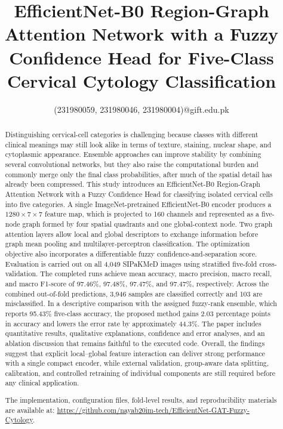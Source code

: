 \documentclass[10pt,conference]{IEEEtran}
\begin{document}
\title{EfficientNet-B0 Region-Graph Attention Network with a Fuzzy Confidence Head for Five-Class Cervical Cytology Classification}

\author{
{(231980059, 231980046, 231980004)}@gift.edu.pk
}

\maketitle

\begin{abstract}
Distinguishing cervical-cell categories is challenging because classes with different clinical meanings may still look alike in terms of texture, staining, nuclear shape, and cytoplasmic appearance. Ensemble approaches can improve stability by combining several convolutional networks, but they also raise the computational burden and commonly merge only the final class probabilities, after much of the spatial detail has already been compressed. This study introduces an EfficientNet-B0 Region-Graph Attention Network with a Fuzzy Confidence Head for classifying isolated cervical cells into five categories. A single ImageNet-pretrained EfficientNet-B0 encoder produces a $1280\times7\times7$ feature map, which is projected to 160 channels and represented as a five-node graph formed by four spatial quadrants and one global-context node. Two graph attention layers allow local and global descriptors to exchange information before graph mean pooling and multilayer-perceptron classification. The optimization objective also incorporates a differentiable fuzzy confidence-and-separation score. Evaluation is carried out on all 4,049 SIPaKMeD images using stratified five-fold cross-validation. The completed runs achieve mean accuracy, macro precision, macro recall, and macro F1-score of 97.46\%, 97.48\%, 97.47\%, and 97.47\%, respectively. Across the combined out-of-fold predictions, 3,946 samples are classified correctly and 103 are misclassified. In a descriptive comparison with the assigned fuzzy-rank ensemble, which reports 95.43\% five-class accuracy, the proposed method gains 2.03 percentage points in accuracy and lowers the error rate by approximately 44.3\%. The paper includes quantitative results, qualitative explanations, confidence and error analyses, and an ablation discussion that remains faithful to the executed code. Overall, the findings suggest that explicit local--global feature interaction can deliver strong performance with a single compact encoder, while external validation, group-aware data splitting, calibration, and controlled retraining of individual components are still required before any clinical application.

The implementation, configuration files, fold-level results, and
reproducibility materials are available at:
\url{https://github.com/nayab20im-tech/EfficientNet-GAT-Fuzzy-Cytology}.
\end{abstract}
\end{document}
